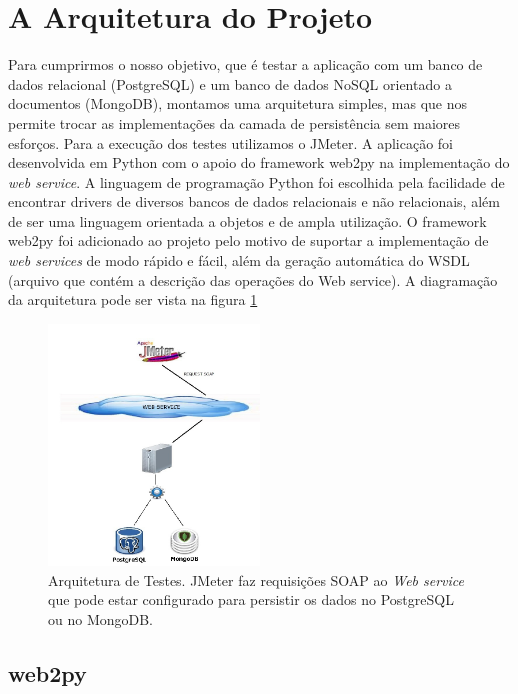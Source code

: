 \section{A Arquitetura do Projeto}

Para cumprirmos o nosso objetivo, que é testar a aplicação com um banco de dados relacional (PostgreSQL) e um banco de dados NoSQL orientado a documentos (MongoDB), montamos uma arquitetura simples, mas que nos permite trocar as implementações da camada de persistência sem maiores esforços. Para a execução dos testes utilizamos o JMeter. A aplicação foi desenvolvida em Python com o apoio do framework web2py na implementação do \textit{web service}. A linguagem de programação Python foi escolhida pela facilidade de encontrar drivers de diversos bancos de dados relacionais e não relacionais, além de ser uma linguagem orientada a objetos e de ampla utilização. O framework web2py foi adicionado ao projeto pelo motivo de suportar a implementação de \textit{web services} de modo rápido e fácil, além da geração automática do WSDL (arquivo que contém a descrição das operações do Web service). A diagramação da arquitetura pode ser vista na figura \ref{fig:arquitetura}

	\begin{figure}[!htbp]
		\begin{center}
			\includegraphics[width=0.5\textwidth]{arquitetura}
		\end{center}
		\caption{Arquitetura de Testes. JMeter faz requisições SOAP ao \textit{Web service} que pode estar configurado para persistir os dados no PostgreSQL ou no MongoDB.}
		\label{fig:arquitetura}
	\end{figure}

\subsection{web2py}

